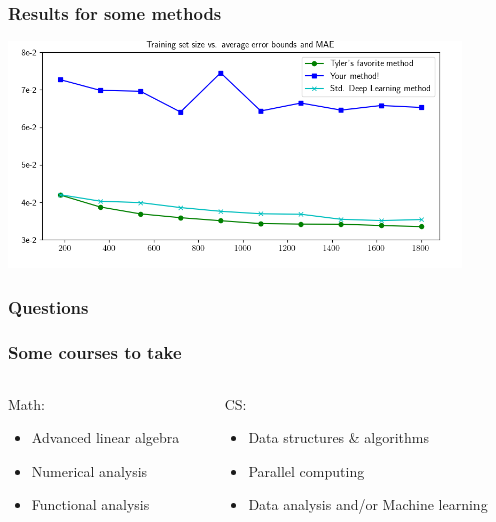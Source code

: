 \documentclass[aspectratio=169]{beamer}
\begin{document}
\begin{frame}\frametitle{Results for some methods}
\begin{center}
\includegraphics[width=0.9\textwidth]{../img/delaunay_new/wind_results_you.png}
\end{center}
\end{frame}

\begin{frame}
  \frametitle{Questions}
  \tableofcontents
  \bigskip
\end{frame}


\begin{frame}\frametitle{Some courses to take}
\begin{columns}
\begin{column}{0.5\textwidth}
Math:
\begin{itemize}
\item Advanced linear algebra
\item Numerical analysis
\item Functional analysis
\end{itemize}
\end{column}
\begin{column}{0.5\textwidth}
CS:
\begin{itemize}
\item Data structures \& algorithms
\item Parallel computing
\item Data analysis and/or Machine learning
\end{itemize}
\end{column}
\end{columns}
\end{frame}
\end{document}
